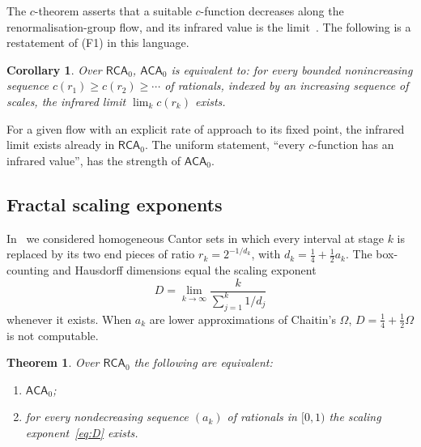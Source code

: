 \documentclass[11pt]{article}
\newtheorem{theorem}{Theorem}
\newtheorem{corollary}{Corollary}[section]
\theoremstyle{definition}\newtheorem{definition}{Definition}[section]
\theoremstyle{remark}\newtheorem*{remark}{Remark}
\newcommand{\RCA}{\mathsf{RCA}_0}
\newcommand{\ACA}{\mathsf{ACA}_0}
\begin{document}
The $c$-theorem asserts that a suitable $c$-function decreases along the renormalisation-group flow, and its infrared
value is the limit~\cite{Zamolodchikov}. The following is a restatement of (F1) in this language.

\begin{corollary}
\label{cor:cfunction}
Over $\RCA$, $\ACA$ is equivalent to: for every bounded nonincreasing sequence $c(r_1)\ge c(r_2)\ge\cdots$ of rationals, indexed
by an increasing sequence of scales, the infrared limit $\lim_kc(r_k)$ exists.
\end{corollary}

For a given flow with an explicit rate of approach to its fixed point, the infrared limit exists already in $\RCA$. The
uniform statement, ``every $c$-function has an infrared value'', has the strength of $\ACA$.

\subsection{Fractal scaling exponents}

In~\cite{Chen2026_chaitin} we considered homogeneous Cantor sets in which every interval at stage $k$ is replaced by its
two end pieces of ratio $r_k=2^{-1/d_k}$, with $d_k=\tfrac14+\tfrac12a_k$. The box-counting and Hausdorff dimensions equal the
scaling exponent
\begin{equation}
D=\lim_{k\to\infty}\frac{k}{\sum_{j=1}^{k}1/d_j}
\label{eq:D}
\end{equation}
whenever it exists. When $a_k$ are lower approximations of Chaitin's $\Omega$, $D=\tfrac14+\tfrac12\Omega$ is not computable.

\begin{theorem}
\label{thm:cantor}
Over $\RCA$ the following are equivalent:
\begin{enumerate}
\item[(i)] $\ACA$;
\item[(ii)] for every nondecreasing sequence $(a_k)$ of rationals in $[0,1)$ the scaling exponent~\eqref{eq:D} exists.
\end{enumerate}
\end{theorem}
\end{document}
